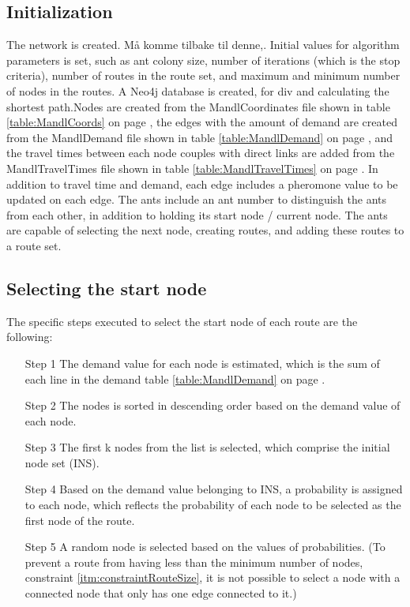 \subsection{Initialization}
The network is created. Må komme tilbake til denne,.
Initial values for algorithm parameters is set, such as ant colony size, number of iterations (which is the stop criteria), number of routes in the route set, and maximum and minimum number of nodes in the routes. A Neo4j database is created, for div and calculating the shortest path.Nodes are created from the MandlCoordinates file shown in table \ref{table:MandlCoords} on page \pageref{table:MandlCoords}, the edges with the amount of demand are created from the MandlDemand file shown in table \ref{table:MandlDemand} on page \pageref{table:MandlDemand}, and the travel times between each node couples with direct links are added from the MandlTravelTimes file shown in table \ref{table:MandlTravelTimes} on page \pageref{table:MandlTravelTimes}. In addition to travel time and demand, each edge includes a pheromone value to be updated on each edge.
The ants include an ant number to distinguish the ants from each other, in addition to holding its start node / current node. The ants are capable of selecting the next node, creating routes, and adding these routes to a route set.  

\subsection{Selecting the start node}
The specific steps executed to select the start node of each route are the following:
\begin{itemize}
\item[Step 1] The demand value for each node is estimated, which is the sum of each line in the demand table \ref{table:MandlDemand} on page \pageref{table:MandlDemand}. 
\item[Step 2] The nodes is sorted in descending order based on the demand value of each node.
\item[Step 3] The first k nodes from the list is selected, which comprise the initial node set (INS). 
\item[Step 4] Based on the demand value belonging to INS, a probability is assigned to each node, which reflects the probability of each node to be selected as the first node of the route. 
\item[Step 5] A random node is selected based on the values of probabilities. (To prevent a route from having less than the minimum number of nodes, constraint \ref{itm:constraintRouteSize}, it is not possible to select a node with a connected node that only has one edge connected to it.)
\end{itemize}

